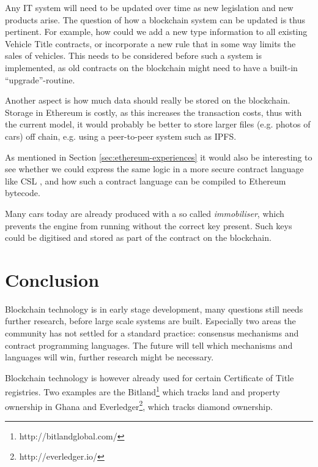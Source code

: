 \documentclass[oneside,a4paper,10pts,article]{memoir}
\begin{document}
Any IT system will need to be updated over time as new legislation and
new products arise. The question of how a blockchain system can be
updated is thus pertinent. For example, how could we add a new type
information to all existing Vehicle Title contracts, or incorporate a
new rule that in some way limits the sales of vehicles. This needs to
be considered before such a system is implemented, as old contracts on
the blockchain might need to have a built-in ``upgrade''-routine.

Another aspect is how much data should really be stored on the
blockchain. Storage in Ethereum is costly, as this increases the
transaction costs, thus with the current model, it would probably be
better to store larger files (e.g. photos of cars) off chain,
e.g. using a peer-to-peer system such as IPFS.

As mentioned in Section \ref{sec:ethereum-experiences} it would also
be interesting to see whether we could express the same logic in a
more secure contract language like CSL \cite{hvitved2011contract}, and
how such a contract language can be compiled to Ethereum bytecode.

Many cars today are already produced with a so called
\textit{immobiliser}, which prevents the engine from running without
the correct key present. Such keys could be digitised and stored as
part of the contract on the blockchain.

\chapter{Conclusion}
\label{sec:conclusion}
Blockchain technology is in early stage development, many questions
still needs further research, before large scale systems are
built. Especially two areas the community has not settled for a
standard practice: consensus mechanisms and contract programming
languages. The future will tell which mechanisms and languages will
win, further research might be necessary.

Blockchain technology is however already used for certain Certificate
of Title registries. Two examples are the
Bitland\footnote{http://bitlandglobal.com/} which tracks land and
property ownership in Ghana and
Everledger\footnote{http://everledger.io/}, which tracks diamond
ownership.



\end{document}
